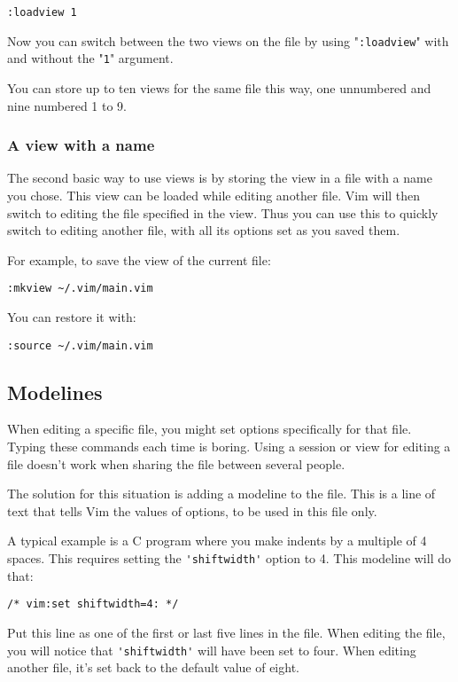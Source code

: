 \begin{Verbatim}[samepage=true]
 :loadview 1
\end{Verbatim}

Now you can switch between the two views on the file by using "\verb!:loadview!" with and without the "\verb!1!" argument.

You can store up to ten views for the same file this way, one unnumbered and nine numbered 1 to 9.
\subsubsection{A view with a name}
The second basic way to use views is by storing the view in a file with a name you chose.
This view can be loaded while editing another file.
Vim will then switch to editing the file specified in the view.
Thus you can use this to quickly switch to editing another file, with all its options set as you saved them.

For example, to save the view of the current file:

\begin{Verbatim}[samepage=true]
 :mkview ~/.vim/main.vim
\end{Verbatim}

You can restore it with:

\begin{Verbatim}[samepage=true]
 :source ~/.vim/main.vim
\end{Verbatim}
\subsection{Modelines}
When editing a specific file, you might set options specifically for that file.
Typing these commands each time is boring.
Using a session or view for editing a file doesn't work when sharing the file between several people.

The solution for this situation is adding a modeline to the file.
This is a line of text that tells Vim the values of options, to be used in this file only.

A typical example is a C program where you make indents by a multiple of 4 spaces.
This requires setting the \verb!'shiftwidth'! option to 4.
This modeline will do that:

\begin{Verbatim}[samepage=true]
    /* vim:set shiftwidth=4: */ 
\end{Verbatim}

Put this line as one of the first or last five lines in the file.
When editing the file, you will notice that \verb!'shiftwidth'! will have been set to four.
When editing another file, it's set back to the default value of eight.

